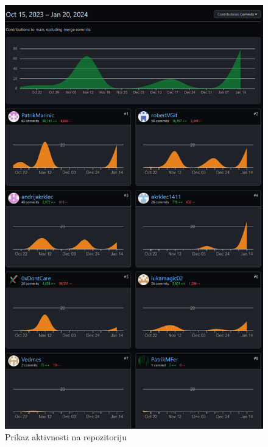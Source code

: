 \begin{figure}[H]
	\centering
	\includegraphics[scale=0.5]{slike/aktivnost.PNG}
	\caption{Prikaz aktivnosti na repozitoriju}
	\label{fig:promjene1}
\end{figure}


